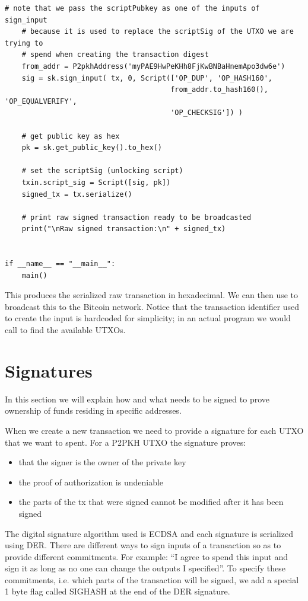\begin{lstlisting}[style=Python]
    # note that we pass the scriptPubkey as one of the inputs of sign_input
    # because it is used to replace the scriptSig of the UTXO we are trying to
    # spend when creating the transaction digest
    from_addr = P2pkhAddress('myPAE9HwPeKHh8FjKwBNBaHnemApo3dw6e')
    sig = sk.sign_input( tx, 0, Script(['OP_DUP', 'OP_HASH160',
                                       from_addr.to_hash160(), 'OP_EQUALVERIFY',
                                       'OP_CHECKSIG']) )

    # get public key as hex
    pk = sk.get_public_key().to_hex()

    # set the scriptSig (unlocking script)
    txin.script_sig = Script([sig, pk])
    signed_tx = tx.serialize()

    # print raw signed transaction ready to be broadcasted
    print("\nRaw signed transaction:\n" + signed_tx)


if __name__ == "__main__":
    main()
\end{lstlisting}
\vspace{1em}

This produces the serialized raw transaction in hexadecimal. We can then use  to broadcast this to the Bitcoin network. Notice that the transaction identifier used to create the input is hardcoded for simplicity; in an actual program we would call  to find the available UTXOs.



\section{Signatures}
\label{sec:signatures}

In this section we will explain how and what needs to be signed to prove ownership of funds residing in specific addresses. 

When we create a new transaction we need to provide a signature for each UTXO that we want to spent. For a P2PKH UTXO the signature proves:

\begin{itemize}
\item that the signer is the owner of the private key
\item the proof of authorization is undeniable
\item the parts of the tx that were signed cannot be modified after it has been signed
\end{itemize}

The digital signature algorithm used is ECDSA and each signature is serialized using DER. There are different ways to sign inputs of a transaction so as to provide different commitments. For example: ``I agree to spend this input and sign it as long as no one can change the outputs I specified''. To specify these commitments, i.e. which parts of the transaction will be signed, we add a special 1 byte flag called SIGHASH at the end of the DER signature.

